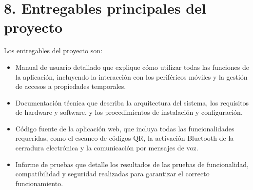 \documentclass[
11pt, %
codirector, %
]{charter}
\begin{document}
\section{8. Entregables principales del proyecto}
\label{sec:entregables}

Los entregables del proyecto son:

\begin{itemize}
    \item Manual de usuario detallado que explique cómo utilizar todas las funciones de la aplicación, incluyendo la interacción con los periféricos móviles y la gestión de accesos a propiedades temporales.
    \item Documentación técnica que describa la arquitectura del sistema, los requisitos de hardware y software, y los procedimientos de instalación y configuración.
    \item Código fuente de la aplicación web, que incluya todas las funcionalidades requeridas, como el escaneo de códigos QR, la activación Bluetooth de la cerradura electrónica y la comunicación por mensajes de voz.
    \item Informe de pruebas que detalle los resultados de las pruebas de funcionalidad, compatibilidad y seguridad realizadas para garantizar el correcto funcionamiento.
\end{itemize}
\end{document}
